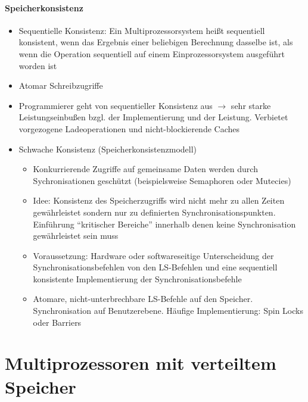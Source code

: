 	\paragraph{Speicherkonsistenz}
		\begin{itemize}
			\item Sequentielle Konsistenz: Ein Multiprozessorsystem heißt sequentiell konsistent, wenn das Ergebnis einer beliebigen Berechnung dasselbe ist, als wenn die Operation sequentiell auf einem Einprozessorsystem ausgeführt worden ist
			\item Atomar Schreibzugriffe
			\item Programmierer geht von sequentieller Konsistenz aus \(\rightarrow\) sehr starke Leistungseinbußen bzgl. der Implementierung und der Leistung. Verbietet vorgezogene Ladeoperationen und nicht-blockierende Caches
			\item Schwache Konsistenz (Speicherkonsistenzmodell)
			\begin{itemize}
				\item Konkurrierende Zugriffe auf gemeinsame Daten werden durch Sychronisationen geschützt (beispielsweise Semaphoren oder Mutecies)
				\item Idee: Konsistenz des Speicherzugriffs wird nicht mehr zu allen Zeiten gewährleistet sondern nur zu definierten Synchronisationspunkten. Einführung "`kritischer Bereiche"' innerhalb denen keine Synchronisation gewährleistet sein muss
				\item Voraussetzung: Hardware oder softwareseitige Unterscheidung der Synchronisationsbefehlen von den LS-Befehlen und eine sequentiell konsistente Implementierung der Synchronisationsbefehle
				\item Atomare, nicht-unterbrechbare LS-Befehle auf den Speicher. Synchronisation auf Benutzerebene. Häufige Implementierung: Spin Locks oder Barriers
			\end{itemize}
		\end{itemize}


\section{Multiprozessoren mit verteiltem Speicher}


